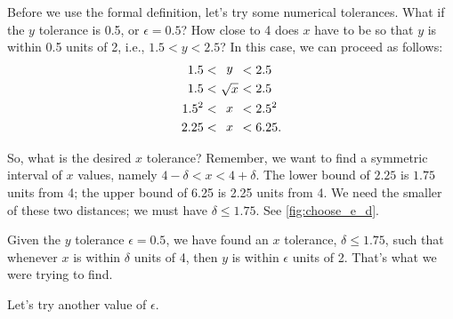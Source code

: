 {Before we use the formal definition, let's try some numerical tolerances.  What if the $y$ tolerance is 0.5, or $\epsilon =0.5$?  How close to 4 does $x$ have to be so that $y$ is within 0.5 units of 2, i.e., $1.5 < y < 2.5$?  In this case, we can proceed as follows:
\begin{align*}
1.5 &< \parbox{15pt}{\centering $y$} < 2.5 \\
1.5 &< \parbox{15pt}{\centering $\sqrt{x}$} < 2.5\\
1.5^2 &< \parbox{15pt}{\centering $x$} < 2.5^2\\
2.25 &< \parbox{15pt}{\centering $x$} < 6.25.
\end{align*}

So, what is the desired $x$ tolerance?  Remember, we want to find a symmetric interval of $x$ values, namely
$4 - \delta < x < 4 + \delta$.  The lower bound of $2.25$ is $1.75$ units from 4; the upper bound of 6.25 is 2.25 units from 4. We need the smaller of these two distances; we must have $\delta \leq 1.75$. See \autoref{fig:choose_e_d}.\bigskip


		

Given the $y$ tolerance $\epsilon =0.5$, we have found an $x$ tolerance, $\delta \leq 1.75$, such that whenever $x$ is within $\delta$ units of 4, then $y$ is within $\epsilon$ units of 2.  That's what we were trying to find.\bigskip
  
Let's try another value of $\epsilon$.\bigskip

}
